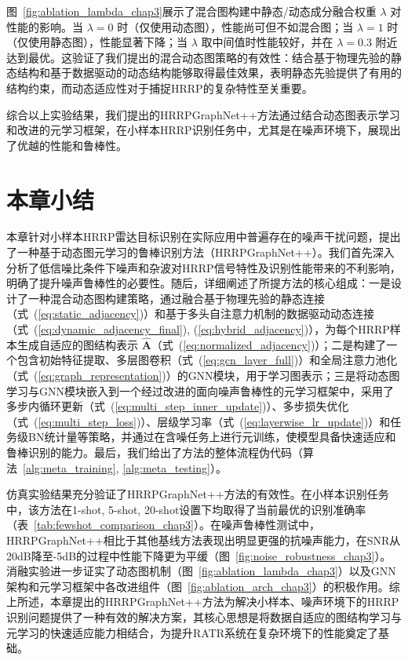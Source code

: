 图~\ref{fig:ablation_lambda_chap3}展示了混合图构建中静态/动态成分融合权重 $\lambda$ 对性能的影响。当 $\lambda=0$ 时（仅使用动态图），性能尚可但不如混合图；当 $\lambda=1$ 时（仅使用静态图），性能显著下降；当 $\lambda$ 取中间值时性能较好，并在 $\lambda=0.3$ 附近达到最优。这验证了我们提出的混合动态图策略的有效性：结合基于物理先验的静态结构和基于数据驱动的动态结构能够取得最佳效果，表明静态先验提供了有用的结构约束，而动态适应性对于捕捉HRRP的复杂特性至关重要。

综合以上实验结果，我们提出的HRRPGraphNet++方法通过结合动态图表示学习和改进的元学习框架，在小样本HRRP识别任务中，尤其是在噪声环境下，展现出了优越的性能和鲁棒性。

\section{本章小结}
\label{sec:noise_summary}

本章针对小样本HRRP雷达目标识别在实际应用中普遍存在的噪声干扰问题，提出了一种基于动态图元学习的鲁棒识别方法（HRRPGraphNet++）。我们首先深入分析了低信噪比条件下噪声和杂波对HRRP信号特性及识别性能带来的不利影响，明确了提升噪声鲁棒性的必要性。随后，详细阐述了所提方法的核心组成：一是设计了一种混合动态图构建策略，通过融合基于物理先验的静态连接（式~(\ref{eq:static_adjacency})）和基于多头自注意力机制的数据驱动动态连接（式~(\ref{eq:dynamic_adjacency_final}), (\ref{eq:hybrid_adjacency})），为每个HRRP样本生成自适应的图结构表示 $\hat{\mathbf{A}}$（式~(\ref{eq:normalized_adjacency})）；二是构建了一个包含初始特征提取、多层图卷积（式~(\ref{eq:gcn_layer_full})）和全局注意力池化（式~(\ref{eq:graph_representation})）的GNN模块，用于学习图表示；三是将动态图学习与GNN模块嵌入到一个经过改进的面向噪声鲁棒性的元学习框架中，采用了多步内循环更新（式~(\ref{eq:multi_step_inner_update})）、多步损失优化（式~(\ref{eq:multi_step_loss})）、层级学习率（式~(\ref{eq:layerwise_lr_update})）和任务级BN统计量等策略，并通过在含噪任务上进行元训练，使模型具备快速适应和鲁棒识别的能力。最后，我们给出了方法的整体流程伪代码（算法~\ref{alg:meta_training}, \ref{alg:meta_testing}）。

仿真实验结果充分验证了HRRPGraphNet++方法的有效性。在小样本识别任务中，该方法在1-shot, 5-shot, 20-shot设置下均取得了当前最优的识别准确率（表~\ref{tab:fewshot_comparison_chap3}）。在噪声鲁棒性测试中，HRRPGraphNet++相比于其他基线方法表现出明显更强的抗噪声能力，在SNR从20dB降至-5dB的过程中性能下降更为平缓（图~\ref{fig:noise_robustness_chap3}）。消融实验进一步证实了动态图机制（图~\ref{fig:ablation_lambda_chap3}）以及GNN架构和元学习框架中各改进组件（图~\ref{fig:ablation_arch_chap3}）的积极作用。综上所述，本章提出的HRRPGraphNet++方法为解决小样本、噪声环境下的HRRP识别问题提供了一种有效的解决方案，其核心思想是将数据自适应的图结构学习与元学习的快速适应能力相结合，为提升RATR系统在复杂环境下的性能奠定了基础。
